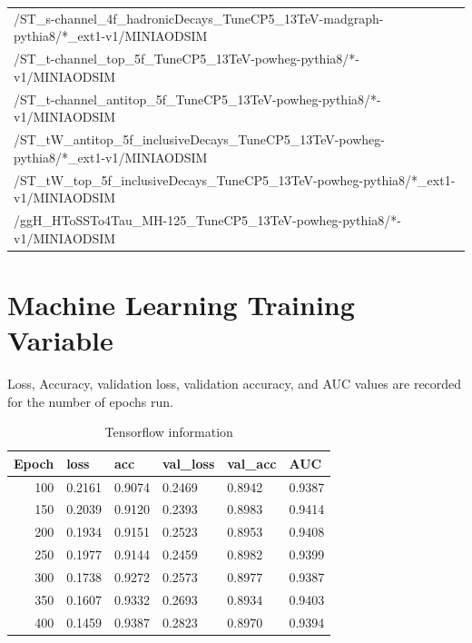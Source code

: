 \begin{table}[htb]
\begin{center}
\begin{tabular}{l}
      /ST\_s-channel\_4f\_hadronicDecays\_TuneCP5\_13TeV-madgraph-pythia8/*\_ext1-v1/MINIAODSIM \\
      /ST\_t-channel\_top\_5f\_TuneCP5\_13TeV-powheg-pythia8/*-v1/MINIAODSIM \\
      /ST\_t-channel\_antitop\_5f\_TuneCP5\_13TeV-powheg-pythia8/*-v1/MINIAODSIM \\
      /ST\_tW\_antitop\_5f\_inclusiveDecays\_TuneCP5\_13TeV-powheg-pythia8/*\_ext1-v1/MINIAODSIM \\
      /ST\_tW\_top\_5f\_inclusiveDecays\_TuneCP5\_13TeV-powheg-pythia8/*\_ext1-v1/MINIAODSIM \\
      \hline
      /ggH\_HToSSTo4Tau\_MH-125\_TuneCP5\_13TeV-powheg-pythia8/*-v1/MINIAODSIM\\
      \hline
    \end{tabular}
    \label{tab:18samplesummary}
  \end{center}
\end{table}

\chapter{Machine Learning Training Variable}

Loss, Accuracy, validation loss, validation accuracy, and AUC values are recorded for the number of epochs run.

\begin{table}[htb]
\caption{Tensorflow information}
\begin{center}
\begin{tabular}{r|l|l|l|l|l}\hline
Epoch &  loss & acc &  val\_loss & val\_acc & AUC\\
\hline
100& 0.2161 & 0.9074 & 0.2469 & 0.8942 & 0.9387\\
150& 0.2039 & 0.9120 & 0.2393 & 0.8983 & 0.9414\\
200& 0.1934 & 0.9151 & 0.2523 & 0.8953 & 0.9408\\
250& 0.1977 & 0.9144 & 0.2459 & 0.8982 & 0.9399\\
300& 0.1738 & 0.9272 & 0.2573 & 0.8977 & 0.9387\\
350& 0.1607 & 0.9332 & 0.2693 & 0.8934 & 0.9403\\
400& 0.1459 & 0.9387 & 0.2823 & 0.8970 & 0.9394\\
\hline
\end{tabular}
\label{tab:Epoch Training}
\end{center}
\end{table}

